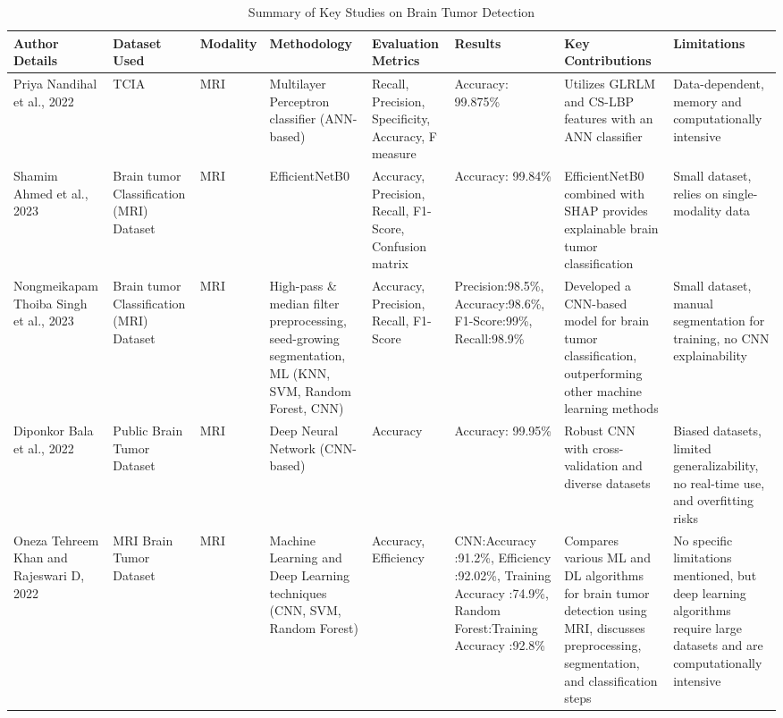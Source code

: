 \documentclass[conference]{IEEEtran}
\begin{document}
\begin{table}[ht]
\caption{Summary of Key Studies on Brain Tumor Detection}
\centering
\renewcommand\arraystretch{1}
\fontsize{6pt}{7pt}\selectfont
\begin{tabular}{|>{\centering\arraybackslash}m{2.5cm}|>{\centering\arraybackslash}m{2cm}|>{\centering\arraybackslash}m{1cm}|>{\centering\arraybackslash}m{2cm}|>{\centering\arraybackslash}m{1.5cm}|>{\centering\arraybackslash}m{2cm}|>{\centering\arraybackslash}m{2cm}|>{\centering\arraybackslash}m{2cm}|}
\hline
\textbf{Author Details} & \textbf{Dataset Used} & \textbf{Modality} & \textbf{Methodology} & \textbf{Evaluation Metrics} & \textbf{Results} & \textbf{Key Contributions} & \textbf{Limitations} \\ \hline
Priya Nandihal et al., 2022\cite{b2} & TCIA & MRI & Multilayer Perceptron classifier (ANN-based) & Recall, Precision, Specificity, Accuracy, F measure & Accuracy: 99.875\% & Utilizes GLRLM and CS-LBP features with an ANN classifier & Data-dependent, memory and computationally intensive \\ \hline
Shamim Ahmed et al., 2023\cite{b4} & Brain tumor Classification (MRI) Dataset & MRI & EfficientNetB0 & Accuracy, Precision, Recall, F1-Score, Confusion matrix & Accuracy: 99.84\% & EfficientNetB0 combined with SHAP provides explainable brain tumor classification & Small dataset, relies on single-modality data \\ \hline
Nongmeikapam Thoiba Singh et al., 2023\cite{b5} & Brain tumor Classification (MRI) Dataset & MRI & High-pass \& median filter preprocessing, seed-growing segmentation, ML (KNN, SVM, Random Forest, CNN) & Accuracy, Precision, Recall, F1-Score & Precision:98.5\%, Accuracy:98.6\%, F1-Score:99\%, Recall:98.9\% & Developed a CNN-based model for brain tumor classification, outperforming other machine learning methods & Small dataset, manual segmentation for training, no CNN explainability \\ \hline
Diponkor Bala et al., 2022\cite{b3} & Public Brain Tumor Dataset & MRI & Deep Neural Network (CNN-based) & Accuracy & Accuracy: 99.95\% & Robust CNN with cross-validation and diverse datasets & Biased datasets, limited generalizability, no real-time use, and overfitting risks \\ \hline
Oneza Tehreem Khan and Rajeswari D, 2022\cite{b1} & MRI Brain Tumor Dataset & MRI & Machine Learning and Deep Learning techniques (CNN, SVM, Random Forest) & Accuracy, Efficiency & CNN:Accuracy :91.2\%, Efficiency :92.02\%, Training Accuracy :74.9\%, Random Forest:Training Accuracy :92.8\% & Compares various ML and DL algorithms for brain tumor detection using MRI, discusses preprocessing, segmentation, and classification steps & No specific limitations mentioned, but deep learning algorithms require large datasets and are computationally intensive \\ \hline

\end{tabular}
\end{table}
\end{document}
